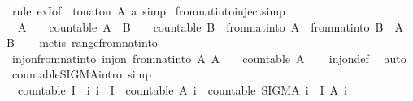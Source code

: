 \begin{isabellebody}
%
\isatagproof
{}\isamarkupfalse%
\ {\isacharparenleft}rule\ exI{\isacharbrackleft}of\ {\isacharunderscore}\ {\isachardoublequoteopen}to{\isacharunderscore}nat{\isacharunderscore}on\ A\ a{\isachardoublequoteclose}{\isacharbrackright}{\isacharparenright}\ simp%
\endisatagproof
{\isafoldproof}%
%
\isadelimproof
\isanewline
%
\endisadelimproof
\isanewline
{}\isamarkupfalse%
\ from{\isacharunderscore}nat{\isacharunderscore}into{\isacharunderscore}inject{\isacharbrackleft}simp{\isacharbrackright}{\isacharcolon}\isanewline
\ \ {\isachardoublequoteopen}A\ {\isasymnoteq}\ {\isacharbraceleft}{\isacharbraceright}\ {\isasymLongrightarrow}\ countable\ A\ {\isasymLongrightarrow}\ B\ {\isasymnoteq}\ {\isacharbraceleft}{\isacharbraceright}\ {\isasymLongrightarrow}\ countable\ B\ {\isasymLongrightarrow}\ from{\isacharunderscore}nat{\isacharunderscore}into\ A\ {\isacharequal}\ from{\isacharunderscore}nat{\isacharunderscore}into\ B\ {\isasymlongleftrightarrow}\ A\ {\isacharequal}\ B{\isachardoublequoteclose}\isanewline
%
\isadelimproof
\ \ %
\endisadelimproof
%
\isatagproof
{}\isamarkupfalse%
\ {\isacharparenleft}metis\ range{\isacharunderscore}from{\isacharunderscore}nat{\isacharunderscore}into{\isacharparenright}%
\endisatagproof
{\isafoldproof}%
%
\isadelimproof
\isanewline
%
\endisadelimproof
\isanewline
{}\isamarkupfalse%
\ inj{\isacharunderscore}on{\isacharunderscore}from{\isacharunderscore}nat{\isacharunderscore}into{\isacharcolon}\ {\isachardoublequoteopen}inj{\isacharunderscore}on\ from{\isacharunderscore}nat{\isacharunderscore}into\ {\isacharparenleft}{\isacharbraceleft}A{\isachardot}\ A\ {\isasymnoteq}\ {\isacharbraceleft}{\isacharbraceright}\ {\isasymand}\ countable\ A{\isacharbraceright}{\isacharparenright}{\isachardoublequoteclose}\isanewline
%
\isadelimproof
\ \ %
\endisadelimproof
%
\isatagproof
{}\isamarkupfalse%
\ inj{\isacharunderscore}on{\isacharunderscore}def\ \isamarkupfalse%
\ auto%
\endisatagproof
{\isafoldproof}%
%
\isadelimproof
%
\endisadelimproof
%
\isadelimdocument
%
\endisadelimdocument
%
\isatagdocument
%
\isamarkuptrue%
%
\endisatagdocument
{\isafolddocument}%
%
\isadelimdocument
%
\endisadelimdocument
{}\isamarkupfalse%
\ countable{\isacharunderscore}SIGMA{\isacharbrackleft}intro{\isacharcomma}\ simp{\isacharbrackright}{\isacharcolon}\isanewline
\ \ {\isachardoublequoteopen}countable\ I\ {\isasymLongrightarrow}\ {\isacharparenleft}{\isasymAnd}i{\isachardot}\ i\ {\isasymin}\ I\ {\isasymLongrightarrow}\ countable\ {\isacharparenleft}A\ i{\isacharparenright}{\isacharparenright}\ {\isasymLongrightarrow}\ countable\ {\isacharparenleft}SIGMA\ i\ {\isacharcolon}\ I{\isachardot}\ A\ i{\isacharparenright}{\isachardoublequoteclose}\isanewline

\end{isabellebody}
